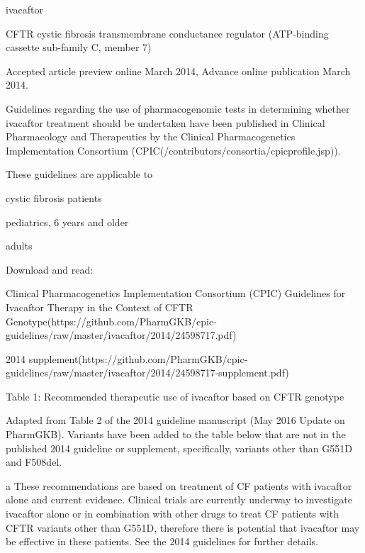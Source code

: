 \documentclass{resume} %
\begin{document}
\begin{rSection}{ ivacaftor }
\begin{rSubsection}{ CFTR }{ cystic fibrosis transmembrane conductance regulator (ATP-binding cassette sub-family C, member 7) }{}{}
\item Accepted article preview online March 2014,  Advance online publication March 2014.
 \newline
\item Guidelines regarding the use of pharmacogenomic tests in determining whether ivacaftor treatment should be undertaken have been published in Clinical Pharmacology and Therapeutics by the Clinical Pharmacogenetics Implementation Consortium (CPIC(/contributors/consortia/cpicprofile.jsp)). 
 \newline
\item These guidelines are applicable to 
 \newline
\item cystic fibrosis patients
 \newline
\item pediatrics, 6 years and older
 \newline
\item adults
 \newline
\item Download and read:
 \newline
\item Clinical Pharmacogenetics Implementation Consortium (CPIC) Guidelines for Ivacaftor Therapy in the Context of CFTR Genotype(https://github.com/PharmGKB/cpic-guidelines/raw/master/ivacaftor/2014/24598717.pdf) 
 \newline
\item 2014 supplement(https://github.com/PharmGKB/cpic-guidelines/raw/master/ivacaftor/2014/24598717-supplement.pdf)
 \newline
\item Table 1: Recommended therapeutic use of ivacaftor based on CFTR genotype
 \newline
\item Adapted from Table 2 of the 2014 guideline manuscript (May 2016 Update on PharmGKB).  Variants have been added to the table below that are not in the published 2014 guideline or supplement,  specifically, variants other than G551D and F508del.
 \newline
\item a These recommendations are based on treatment of CF patients with ivacaftor alone and current evidence. Clinical trials are currently underway to investigate ivacaftor alone or in combination with other drugs to treat CF patients with CFTR variants other than G551D, therefore there is potential that ivacaftor may be effective in these patients. See the 2014 guidelines for further details.

\end{rSubsection}
\end{rSection}
\end{document}
